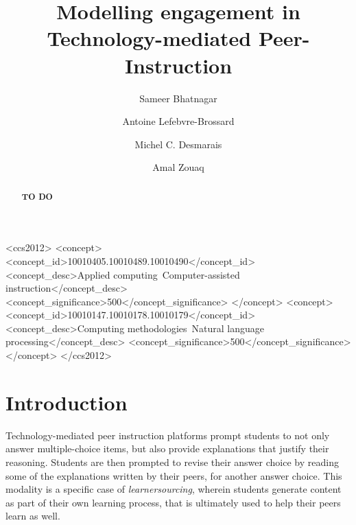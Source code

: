 \documentclass[sigconf]{acmart}
\begin{document}
\title{Modelling engagement in Technology-mediated 
Peer-Instruction}

\author{Sameer Bhatnagar}
\author{Antoine Lefebvre-Brossard}
\author{Michel C. Desmarais}
\author{Amal Zouaq}


\renewcommand{\shortauthors}{Bhatnagar, et al.}

\begin{abstract}
\textbf{TO DO}
\end{abstract}


\begin{CCSXML}
	<ccs2012>
	<concept>
	<concept_id>10010405.10010489.10010490</concept_id>
	<concept_desc>Applied 
	computing~Computer-assisted 
	instruction</concept_desc>
	<concept_significance>500</concept_significance>
	</concept>
	<concept>
	<concept_id>10010147.10010178.10010179</concept_id>
	<concept_desc>Computing methodologies~Natural 
	language processing</concept_desc>
	<concept_significance>500</concept_significance>
	</concept>
	</ccs2012>
\end{CCSXML}





\maketitle

\section{Introduction}

Technology-mediated peer instruction platforms 
\cite{univeristy_of_british_columbia_ubc/ubcpi_2019}\cite{charles_harnessing_2019}
prompt students to not only answer multiple-choice items, but also provide 
explanations that justify their reasoning. 
Students are then prompted to revise their answer choice by reading some of the 
explanations written by their peers, for another answer choice.
This modality is a specific case of 
\textit{learnersourcing}\cite{weir_learnersourcing_2015}, wherein students 
generate content as part of their own learning process, that is ultimately used 
to help their peers learn as well. 
\end{document}
